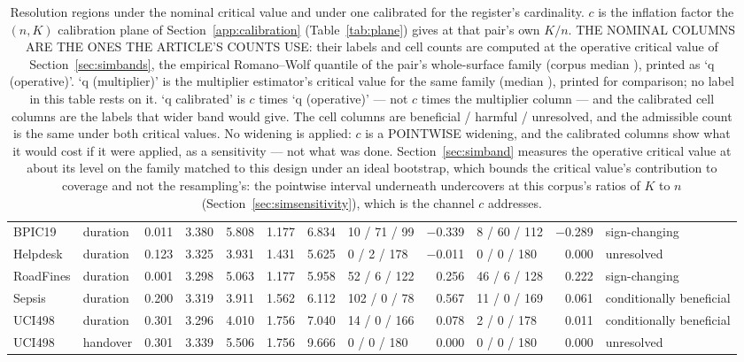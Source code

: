 \begin{landscape}
\begin{table}[t]
{\begin{tabular}{llrrrrrlrlrl}
BPIC19 & duration & 0.011 & 3.380 & 5.808 & 1.177 & 6.834 & 10 / 71 / 99 & $-$0.339 & 8 / 60 / 112 & $-$0.289 & sign-changing \\
Helpdesk & duration & 0.123 & 3.325 & 3.931 & 1.431 & 5.625 & 0 / 2 / 178 & $-$0.011 & 0 / 0 / 180 & 0.000 & unresolved \\
RoadFines & duration & 0.001 & 3.298 & 5.063 & 1.177 & 5.958 & 52 / 6 / 122 & 0.256 & 46 / 6 / 128 & 0.222 & sign-changing \\
Sepsis & duration & 0.200 & 3.319 & 3.911 & 1.562 & 6.112 & 102 / 0 / 78 & 0.567 & 11 / 0 / 169 & 0.061 & conditionally beneficial \\
UCI498 & duration & 0.301 & 3.296 & 4.010 & 1.756 & 7.040 & 14 / 0 / 166 & 0.078 & 2 / 0 / 178 & 0.011 & conditionally beneficial \\
UCI498 & handover & 0.301 & 3.339 & 5.506 & 1.756 & 9.666 & 0 / 0 / 180 & 0.000 & 0 / 0 / 180 & 0.000 & unresolved \\
\bottomrule
\end{tabular}%
}
\caption{Resolution regions under the nominal critical value and under one calibrated for the register's cardinality. $c$ is the inflation factor the $(n, K)$ calibration plane of Section~\ref{app:calibration} (Table~\ref{tab:plane}) gives at that pair's own $K/n$. THE NOMINAL COLUMNS ARE THE ONES THE ARTICLE'S COUNTS USE: their labels and cell counts are computed at the operative critical value of Section~\ref{sec:simbands}, the empirical Romano--Wolf quantile of the pair's whole-surface family (corpus median \maxTSurfaceMedian), printed as `q (operative)'. `q (multiplier)' is the multiplier estimator's critical value for the same family (median \maxTSurfaceMultMedian), printed for comparison; no label in this table rests on it. `q calibrated' is $c$ times `q (operative)' --- not $c$ times the multiplier column --- and the calibrated cell columns are the labels that wider band would give. The cell columns are beneficial / harmful / unresolved, and the admissible count is the same under both critical values. No widening is applied: $c$ is a POINTWISE widening, and the calibrated columns show what it would cost if it were applied, as a sensitivity --- not what was done. Section~\ref{sec:simband} measures the operative critical value at about its level on the family matched to this design under an ideal bootstrap, which bounds the critical value's contribution to coverage and not the resampling's: the pointwise interval underneath undercovers at this corpus's ratios of $K$ to $n$ (Section~\ref{sec:simsensitivity}), which is the channel $c$ addresses.}
\label{tab:calbands}
\end{table}
\end{landscape}
